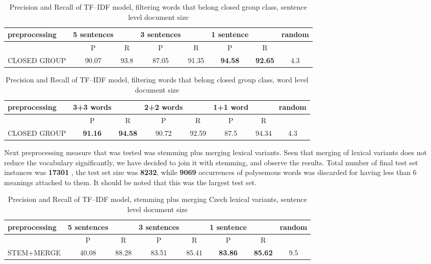 \begin{table}[h!]
\begin{tabular}{ l | c c | c c | c c | c}
   preprocessing &  5 sentences && 3 sentences && 1 sentence  && random\\
\hline
	& P  &  R & P  &  R & P  &  R &\\
\hline\hline
CLOSED GROUP & 90.07 & 93.8  & 87.05  & 91.35  & \textbf{94.58}  & \textbf{92.65}  & 4.3  \\
\end{tabular}
\caption{Precision and Recall of TF--IDF model, filtering words that belong closed group class, sentence level document size}
\end{table}

\begin{table}[h!]
\begin{tabular}{ l | c c | c c | c c | c}
   preprocessing &  3+3 words && 2+2 words && 1+1 word  && random\\
\hline\hline
	& P  &  R & P  &  R & P  &  R &\\
\hline
CLOSED GROUP & \textbf{91.16}  & \textbf{94.58} & 90.72 & 92.59 & 87.5  & 94.34  & 4.3  \\
\end{tabular}
\caption{Precision and Recall of TF--IDF model, filtering words that belong closed group class, word level document size}
\end{table}

Next preprocessing measure that was tested was stemming plus merging lexical variants. Seen that
merging of lexical variants does not reduce the vocabulary significantly, we have decided to join it
with stemming, and observe the results. Total number of final test set instances was  \textbf{17301} , the test set size was \textbf{8232}, while \textbf{9069} occurrences of polysemous words was discarded for having less than 6 meanings attached to them. It should be noted that this was the largest test set.

\begin{table}[h!]
\begin{tabular}{ l | c c | c c | c c | c}
   preprocessing &  5 sentences && 3 sentences && 1 sentence  && random\\
\hline
	& P  &  R & P  &  R & P  &  R &\\
\hline\hline
STEM+MERGE & 40.08  & 88.28  & 83.51  & 85.41  & \textbf{83.86}  &  \textbf{85.62} & 9.5  \\
\end{tabular}
\caption{Precision and Recall of TF--IDF model, stemming plus merging Czech lexical variants, sentence level document size}
\end{table}

